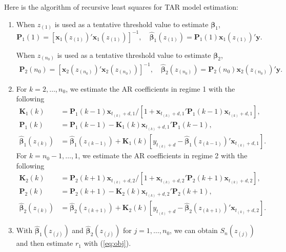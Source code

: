 Here is the algorithm of recursive least squares for TAR model estimation:
\begin{enumerate}
\item When ${z}_{(1)}$ is used as a tentative threshold value to estimate $\boldsymbol{\beta}_1$,
\[
{\mathbf P}_1(1)=[{\mathbf x}_1({z}_{(1)})' {\mathbf x}_1({z}_{(1)})]^{-1}, \quad \hat{\boldsymbol{\beta}}_1({z}_{(1)})={\mathbf P}_1(1) {\mathbf x}_1({z}_{(1)})'{\mathbf y}.
\]

When ${z}_{(n_0)}$ is used as a tentative threshold value to estimate $\boldsymbol{\beta}_2$,
\begin{align*}
{\mathbf P}_2(n_0)=[{\mathbf x}_{2}({z}_{(n_0)})' {\mathbf x}_2({z}_{(n_0)})]^{-1}, \quad  \hat{\boldsymbol{\beta}}_2({z}_{(n_0)})={\mathbf P}_2({n_0}){\mathbf x}_{2}({z}_{(n_0)})'{\mathbf y}.
\end{align*}
\item For $k=2,\ldots,n_0$, we estimate the AR coefficients in regime 1 with the following
\begin{align*}
{\mathbf K}_1({k})&={\mathbf P}_1(k-1) {\mathbf x}_{t_{(k)}+d,1}/[1+{\mathbf x}_{t_{(k)}+d,1}'{\mathbf P}_1(k-1){\mathbf x}_{t_{(k)}+d,1}], \\
{\mathbf P}_1(k)&={\mathbf P}_1(k-1)-{\mathbf K}_1(k) {\mathbf x}_{t_{(k)}+d,1}' {\mathbf P}_1(k-1),\\
\hat{\boldsymbol{\beta}}_1({z}_{(k)})&=\hat{\boldsymbol{\beta}}_1({z}_{(k-1)})+{\mathbf K}_1(k)[y_{t_{(k)}+d}- \hat{\boldsymbol{\beta}}_1(z_{(k-1)})'{\mathbf x}_{t_{(k)}+d,1}].
\end{align*}
For $k=n_0-1,\ldots,1$, we estimate the AR coefficients in regime 2 with the following
\begin{align*}
{\mathbf K}_2({k})&={\mathbf P}_2(k+1) {\mathbf x}_{t_{(k)}+d,2}/[1+{\mathbf x}_{t_{(k)}+d,2}'{\mathbf P}_2(k+1){\mathbf x}_{t_{(k)}+d,2}], \\
{\mathbf P}_2(k)&={\mathbf P}_2(k+1)-{\mathbf K}_2(k) {\mathbf x}_{t_{(k)}+d,2}' {\mathbf P}_2(k+1),\\
\hat{\boldsymbol{\beta}}_2({z}_{(k)})&=\hat{\boldsymbol{\beta}}_2({z}_{(k+1)})+{\mathbf K}_2(k)[y_{t_{(k)}+d}- \hat{\boldsymbol{\beta}}_2(z_{(k+1)})'{\mathbf x}_{t_{(k)}+d,2}].
\end{align*}
\item With $\hat{\boldsymbol{\beta}}_1(z_{(j)})$ and $\hat{\boldsymbol{\beta}}_2(z_{(j)})$ for $j=1,\ldots, n_0$, we can obtain $S_n(z_{(j)})$ and then estimate $r_1$ with (\ref{eq:obj}).
\end{enumerate}



